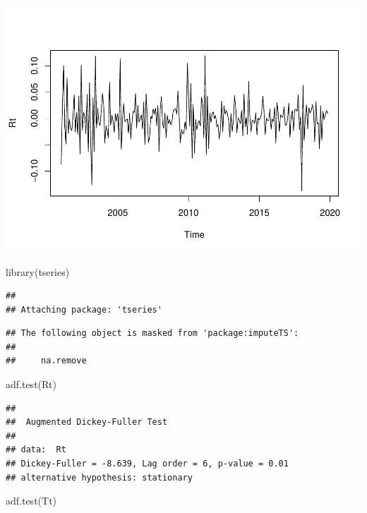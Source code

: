 \documentclass[10pt]{report}
\newenvironment{Shaded}{\begin{snugshade}}{\end{snugshade}}
\newcommand{\FunctionTok}[1]{\textcolor[rgb]{0.00,0.00,0.00}{#1}}
\newcommand{\NormalTok}[1]{#1}
\begin{document}
\includegraphics{unnamed-chunk-16-3.pdf}

\begin{Shaded}
\begin{Highlighting}[]
\FunctionTok{library}\NormalTok{(tseries)}
\end{Highlighting}
\end{Shaded}

\begin{verbatim}
## 
## Attaching package: 'tseries'
\end{verbatim}

\begin{verbatim}
## The following object is masked from 'package:imputeTS':
## 
##     na.remove
\end{verbatim}

\begin{Shaded}
\begin{Highlighting}[]
\FunctionTok{adf.test}\NormalTok{(Rt)}
\end{Highlighting}
\end{Shaded}

\begin{verbatim}
## 
##  Augmented Dickey-Fuller Test
## 
## data:  Rt
## Dickey-Fuller = -8.639, Lag order = 6, p-value = 0.01
## alternative hypothesis: stationary
\end{verbatim}

\begin{Shaded}
\begin{Highlighting}[]
\FunctionTok{adf.test}\NormalTok{(Tt)}
\end{Highlighting}
\end{Shaded}
\end{document}
